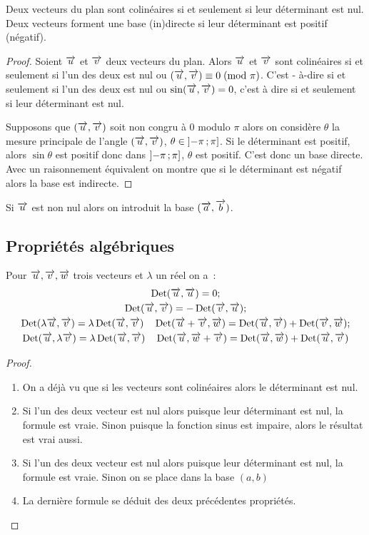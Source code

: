 \begin{prop}
  Deux vecteurs du plan sont colinéaires si et seulement si leur déterminant est 
  nul. Deux vecteurs forment une base (in)directe si leur déterminant est 
  positif (négatif).
\end{prop}

\begin{proof}
  Soient \(\overrightarrow{u}\) et \(\overrightarrow{v}\) deux vecteurs du plan. Alors \(\overrightarrow{u}\) et \(\overrightarrow{v}\) sont 
  colinéaires si et seulement si l'un des deux est nul ou \((\overrightarrow{u} , 
  \overrightarrow{v}) \equiv 0\!\pmod {\pi}\). C'est - à-dire si et seulement si l'un des deux est nul ou \( 
  \sin(\overrightarrow{u} , \overrightarrow{v}) = 0\), c'est à dire si et seulement si leur déterminant est 
  nul.

  Supposons que \((\overrightarrow{u} , \overrightarrow{v})\) soit non congru à 0 modulo \(\pi\) alors on 
  considère \(\theta\) la mesure principale de l'angle \((\overrightarrow{u} , \overrightarrow{v})\), \(\theta 
  \in \left] -\pi \, ;  \pi \right]\). Si le déterminant est positif, alors \(\sin 
  \theta\) est positif donc dans \(\left] -\pi \, ;  \pi  \right]\), \(\theta\) est 
  positif. C'est donc un base directe. Avec un raisonnement équivalent on montre 
  que si le déterminant est négatif alors la base est indirecte.
\end{proof}

Si \(\overrightarrow{u}\) est non nul alors on introduit la base \((\overrightarrow{a},\overrightarrow{b})\).

\subsection{Propriétés algébriques}

\begin{prop}
  Pour \(\overrightarrow{u}, \overrightarrow{v}, \overrightarrow{w}\) trois vecteurs et \(\lambda\) un réel on a~:
  \begin{gather}
    \operatorname{Det}(\overrightarrow{u} , \overrightarrow{u}) = 0;\\
    \operatorname{Det}(\overrightarrow{u}, \overrightarrow{v}) = -\operatorname{Det}(\overrightarrow{v}, \overrightarrow{u});\\
    \operatorname{Det}( \lambda \overrightarrow{u}, \overrightarrow{v}) = \lambda \operatorname{Det}(\overrightarrow{u}, \overrightarrow{v}) \quad \operatorname{Det}(\overrightarrow{u}+ \overrightarrow{v}, \overrightarrow{w}) 
    =\operatorname{Det}(\overrightarrow{u}, \overrightarrow{v}) + \operatorname{Det}(\overrightarrow{v}, \overrightarrow{w});\\
    \operatorname{Det}(\overrightarrow{u}, \lambda \overrightarrow{v}) = \lambda \operatorname{Det}(\overrightarrow{u}, \overrightarrow{v}) \quad \operatorname{Det}(\overrightarrow{u}, \overrightarrow{w} + \overrightarrow{v}) 
    =\operatorname{Det}(\overrightarrow{u}, \overrightarrow{w}) + \operatorname{Det}(\overrightarrow{u}, \overrightarrow{v})
  \end{gather}
\end{prop}

\begin{proof}
  \begin{enumerate}
    \item On a déjà vu que si les vecteurs sont colinéaires alors le déterminant 
      est nul.
    \item Si l'un des deux vecteur est nul alors puisque leur déterminant est 
      nul, la formule est vraie. Sinon puisque la fonction sinus est impaire, 
      alors le résultat est vrai aussi.
    \item Si l'un des deux vecteur est nul alors puisque leur déterminant est 
      nul, la formule est vraie. Sinon on se place dans la base \((a, b)\)
    \item La dernière formule se déduit des deux précédentes propriétés.
  \end{enumerate}
\end{proof}

